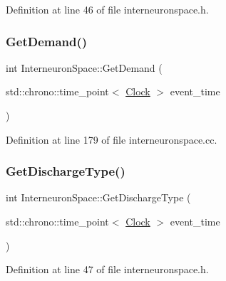 Definition at line 46 of file interneuronspace.\+h.

\mbox{\label{class_interneuron_space_ae62237c3a84893c81e9998602ab16718}} 
\subsubsection{\texorpdfstring{Get\+Demand()}{GetDemand()}}
{\footnotesize\ttfamily int Interneuron\+Space\+::\+Get\+Demand (\begin{DoxyParamCaption}\item[{std\+::chrono\+::time\+\_\+point$<$ \mbox{\hyperlink{universe_8h_a0ef8d951d1ca5ab3cfaf7ab4c7a6fd80}{Clock}} $>$}]{event\+\_\+time }\end{DoxyParamCaption})}



Definition at line 179 of file interneuronspace.\+cc.

\mbox{\label{class_interneuron_space_ae65bf091b84fa11459ef754ed1c7bf21}} 
\subsubsection{\texorpdfstring{Get\+Discharge\+Type()}{GetDischargeType()}}
{\footnotesize\ttfamily int Interneuron\+Space\+::\+Get\+Discharge\+Type (\begin{DoxyParamCaption}\item[{std\+::chrono\+::time\+\_\+point$<$ \mbox{\hyperlink{universe_8h_a0ef8d951d1ca5ab3cfaf7ab4c7a6fd80}{Clock}} $>$}]{event\+\_\+time }\end{DoxyParamCaption})\hspace{0.3cm}{\ttfamily [inline]}}



Definition at line 47 of file interneuronspace.\+h.

\mbox{\label{class_interneuron_space_a634322f8b405ead2dc51afb0a5c3d725}} 
